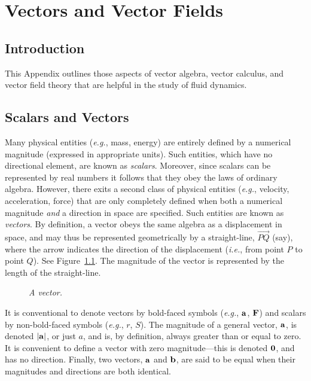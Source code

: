 \chapter{Vectors and Vector Fields}\label{vector}
\section{Introduction}
This Appendix outlines those aspects of vector algebra, vector calculus, and
vector field theory that are helpful in the study of fluid dynamics. 

\section{Scalars and Vectors}
Many physical entities ({\em e.g.}, mass, energy) are 
 entirely defined by a numerical magnitude (expressed in appropriate units). Such entities, which have no directional element, are
known as {\em scalars}. Moreover, since scalars can be represented by real numbers 
it follows that they obey the  laws of ordinary algebra. However, there exits a
second class of physical entities ({\em e.g.}, velocity, acceleration, force) that are
only completely defined when both a numerical magnitude {\em and}\/ a direction in space are specified. 
Such entities are known as {\em vectors}. By definition, a vector obeys the same algebra as
a displacement in space, and may thus be represented geometrically by a
straight-line, $\stackrel{\displaystyle \rightarrow}{PQ}$ (say), where the arrow
indicates the direction of the displacement ({\em i.e.}, from point $P$ to point $Q$). See Figure~\ref{fig1}. 
The magnitude of the vector is represented by the length of the  straight-line.

\begin{figure}
\epsfysize=1.25in
\centerline{}
\caption{\em A vector.}\label{fig1}
\end{figure}

It is conventional to denote vectors by bold-faced symbols ({\em e.g.}, ${\bf a}$, ${\bf F}$) and
scalars by non-bold-faced symbols ({\em e.g.}, $r$, $S$). The magnitude of
a general vector, ${\bf a}$, is  denoted  $|{\bf a}|$, or just $a$, and is, by definition, always
greater than or equal to zero. It is convenient to define a vector with zero magnitude---this is
denoted ${\bf 0}$, and has no direction. Finally, two vectors, ${\bf a}$ and ${\bf b}$, are said
to be equal when their magnitudes and directions are both identical. 

